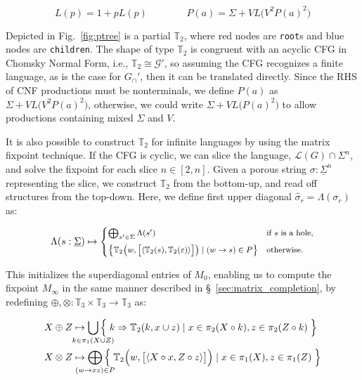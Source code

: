 \documentclass[sigplan,acmsmall,nonacm,screen]{acmart}\settopmatter{printfolios=false,printccs=false,printacmref=false}
\begin{document}
  \begin{equation}
    L(p) = 1 + p L(p) \phantom{addspace} P(a) = \Sigma + V L\big(V^2P(a)^2\big)
  \end{equation}

  Depicted in Fig.~\ref{fig:ptree} is a partial $\mathbb{T}_2$, where red nodes are \texttt{root}s and blue nodes are \texttt{children}. The shape of type $\mathbb{T}_2$ is congruent with an acyclic CFG in Chomsky Normal Form, i.e., $\mathbb{T}_2\cong\mathcal{G}'$, so assuming the CFG recognizes a finite language, as is the case for $G_\cap'$, then it can be translated directly. Since the RHS of CNF productions must be nonterminals, we define $P(a)$ as $\Sigma + V L\big(V^2P(a)^2\big)$, otherwise, we could write $\Sigma + VL\big(P(a)^2\big)$ to allow productions containing mixed $\Sigma$ and $V$.

  It is also possible to construct $\mathbb{T}_2$ for infinite languages by using the matrix fixpoint technique. If the CFG is cyclic, we can slice the language, $\mathcal{L}(G)\cap \Sigma^n$, and solve the fixpoint for each slice $n \in [2, n]$. Given a porous string $\sigma: \underline\Sigma^n$ representing the slice, we construct $\mathbb{T}_2$ from the bottom-up, and read off structures from the top-down. Here, we define first upper diagonal $\hat\sigma_r = \Lambda(\sigma_r)$ as:

\vspace{-5pt}\begin{equation}
  \begin{footnotesize}
\Lambda(s: \underline\Sigma) \mapsto \begin{cases}
\bigoplus_{s'\in \Sigma} \Lambda(s') & \text{if $s$ is a hole,} \vspace{5pt}\\
\big\{\mathbb{T}_2\big(w, \big[\langle\mathbb{T}_2(s), \mathbb{T}_2(\varepsilon)\rangle\big]\big) \mid (w \rightarrow s)\in P\big\} & \text{otherwise.}
\end{cases}
  \end{footnotesize}
\end{equation}

\noindent This initializes the superdiagonal entries of $M_0$, enabling us to compute the fixpoint $M_\infty$ in the same manner described in \S~\ref{sec:matrix_completion}, by redefining $\oplus, \otimes: \mathbb{T}_3 \times \mathbb{T}_3 \rightarrow \mathbb{T}_3$ as:

\vspace{-5pt}\begin{align}
  X \oplus Z &\mapsto \bigcup_{\mathclap{k\in \pi_1(X \cup Z)}}\Big\{\phantom{.}k \Rightarrow \mathbb{T}_2(k, x \cup z) \mid x \in \pi_2(X\circ k), z \in \pi_2(Z\circ k)\phantom{.}\Big\}\\
  X \otimes Z &\mapsto \bigoplus_{\mathclap{(w\rightarrow xz) \in P}}\Big\{\phantom{.}\mathbb{T}_2\Big(w, \big[\langle X\circ x, Z\circ z\rangle\big]\Big) \mid x \in \pi_1(X), z \in \pi_1(Z)\phantom{.}\Big\}
\end{align}
\end{document}
